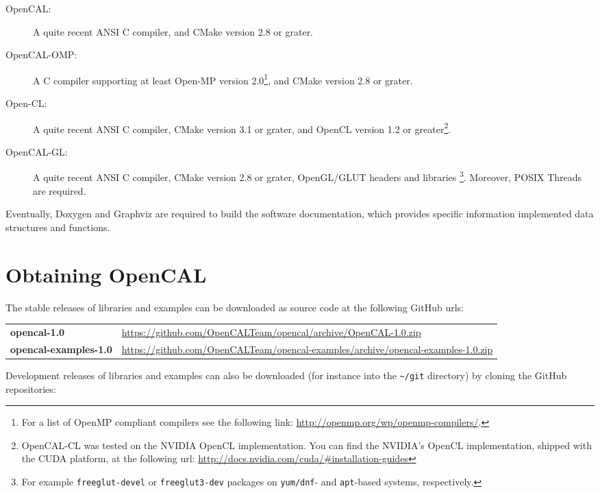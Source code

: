 \begin{description}
\item[OpenCAL: ] A quite recent ANSI C compiler, and CMake version 2.8
  or grater.
\item[OpenCAL-OMP: ] A C compiler supporting at least Open-MP version
  2.0\footnote{For a list of OpenMP compliant compilers see the
    following link: \url{http://openmp.org/wp/openmp-compilers/}.},
  and CMake version 2.8 or grater.
\item[Open-CL: ] A quite recent ANSI C compiler, CMake version 3.1 or
  grater, and OpenCL version 1.2 or greater\footnote{OpenCAL-CL was
    tested on the NVIDIA OpenCL implementation. You can find the
    NVIDIA's OpenCL implementation, shipped with the CUDA platform, at
    the following url:
    \url{http://docs.nvidia.com/cuda/\#installation-guides}}.
\item[OpenCAL-GL: ] A quite recent ANSI C compiler, CMake version 2.8
  or grater, OpenGL/GLUT headers and libraries \footnote{For
  example \texttt{freeglut-devel} or \texttt{freeglut3-dev} packages
  on \texttt{yum/dnf}- and \texttt{apt}-based systems,
  respectively.}. Moreover, POSIX Threads are required.
\end{description}

\noindent Eventually, Doxygen and Graphviz are required to build the
software documentation, which provides specific information
implemented data structures and functions.

\section{Obtaining OpenCAL}

The stable releases of libraries and examples can be downloaded as source code at the
following GitHub urls:

\begin{table}[h]
  \centering
  \begin{tabularx}{\textwidth}{lX}
    \textbf{opencal-1.0} & \url{https://github.com/OpenCALTeam/opencal/archive/OpenCAL-1.0.zip}\\
    \textbf{opencal-examples-1.0} & \url{https://github.com/OpenCALTeam/opencal-examples/archive/opencal-examples-1.0.zip}\\
  \end{tabularx}
\end{table}

\noindent Development releases of libraries and examples can also be
downloaded (for instance into the \verb'~/git' directory) by cloning
the GitHub repositories:

